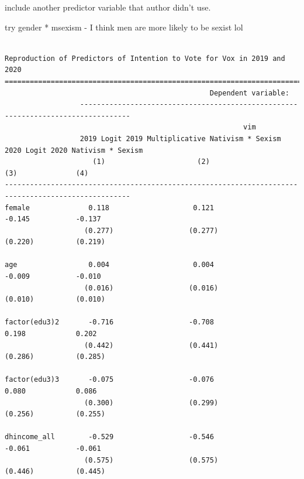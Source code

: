 \documentclass[
  letterpaper,
  DIV=11,
  numbers=noendperiod]{scrartcl}
\begin{document}
include another predictor variable that author didn't use.

try gender * msexism - I think men are more likely to be sexist lol

\begin{verbatim}

Reproduction of Predictors of Intention to Vote for Vox in 2019 and 2020
====================================================================================================
                                                 Dependent variable:                                
                  ----------------------------------------------------------------------------------
                                                         vim                                        
                  2019 Logit 2019 Multiplicative Nativism * Sexism 2020 Logit 2020 Nativism * Sexism
                     (1)                      (2)                     (3)              (4)          
----------------------------------------------------------------------------------------------------
female              0.118                    0.121                   -0.145           -0.137        
                   (0.277)                  (0.277)                 (0.220)          (0.219)        
                                                                                                    
age                 0.004                    0.004                   -0.009           -0.010        
                   (0.016)                  (0.016)                 (0.010)          (0.010)        
                                                                                                    
factor(edu3)2       -0.716                  -0.708                   0.198            0.202         
                   (0.442)                  (0.441)                 (0.286)          (0.285)        
                                                                                                    
factor(edu3)3       -0.075                  -0.076                   0.080            0.086         
                   (0.300)                  (0.299)                 (0.256)          (0.255)        
                                                                                                    
dhincome_all        -0.529                  -0.546                   -0.061           -0.061        
                   (0.575)                  (0.575)                 (0.446)          (0.445)        
                                                                                                    

\end{verbatim}
\end{document}
